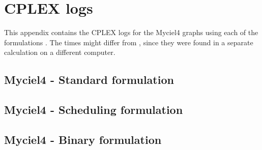 \appendix
\chapter{CPLEX logs}
This appendix contains the CPLEX logs for the Myciel4 graphs using each of the formulations . The times might differ from , since they were found in a separate calculation on a different computer.
\section{Myciel4 - Standard formulation}

\newpage
\section{Myciel4 - Scheduling formulation}

\newpage
\section{Myciel4 - Binary formulation}


